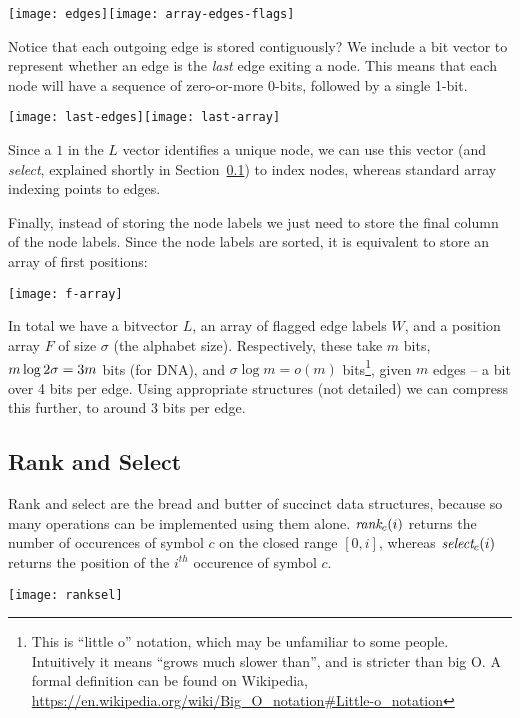 \medskip\centerline{\texttt{[image: edges]}\hfill\texttt{[image: array-edges-flags]}}\medskip
 
Notice that each outgoing edge is stored contiguously? We include a bit vector to represent whether an edge is the \emph{last} edge exiting a node. This means that each node will have a sequence of zero-or-more 0-bits, followed by a single 1-bit.

\medskip\centerline{\texttt{[image: last-edges]}\hfill\texttt{[image: last-array]}}\medskip
 
Since a $1$ in the $L$ vector identifies a unique node, we can use this vector (and \emph{select}, explained shortly in Section~\ref{bl-sec:ras}) to index nodes, whereas standard array indexing points to edges.

Finally, instead of storing the node labels we just need to store the final column of the node labels. Since the node labels are sorted, it is equivalent to store an array of first positions:

\medskip\centerline{\texttt{[image: f-array]}}\medskip

In total we have a bitvector $L$, an array of flagged edge labels $W$, and a position array $F$ of size $\sigma$ (the alphabet size). Respectively, these take $m$ bits, $m\log{2\*\sigma}=3m$ bits (for DNA), and $\sigma \log{m} = o(m)$ bits\footnote{This is “little o” notation, which may be unfamiliar to some people. Intuitively it means “grows much slower than”, and is stricter than big O. A formal definition can be found on Wikipedia, \url{https://en.wikipedia.org/wiki/Big_O_notation\#Little-o_notation}}, given $m$ edges -- a bit over 4 bits per edge. Using appropriate structures (not detailed) we can compress this further, to around 3 bits per edge.

\subsection{Rank and Select}\label{bl-sec:ras}

Rank and select are the bread and butter of succinct data structures, because so many operations can be implemented using them alone. $\textit{rank}_c(i)$ returns the number of occurences of symbol $c$ on the closed range $[0,i]$, whereas $\textit{select}_c(
i)$  returns the position of the $i^{th}$ occurence of symbol $c$.

\medskip\centerline{\texttt{[image: ranksel]}}\medskip

